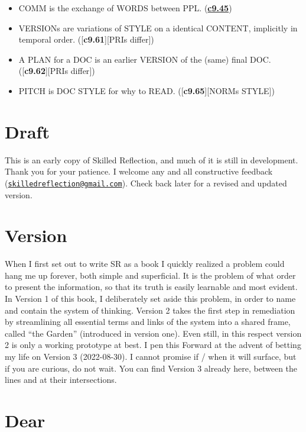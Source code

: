 \documentclass[
]{book}
\begin{document}
\begin{itemize}
\item
  COMM is the exchange of WORDS between PPL. (\hyperref[style]{\textbf{c9.45}})\\
\item
  VERSIONs are variations of STYLE on a identical CONTENT, implicitly in temporal order. ({[}\textbf{c9.61}{]}{[}PRIs differ{]})\\
\item
  A PLAN for a DOC is an earlier VERSION of the (same) final DOC. ({[}\textbf{c9.62}{]}{[}PRIs differ{]})\\
\item
  PITCH is DOC STYLE for why to READ. ({[}\textbf{c9.65}{]}{[}NORMs STYLE{]})
\end{itemize}

\section{Draft}\label{draft}

This is an early copy of Skilled Reflection, and much of it is still in development. Thank you for your patience. I welcome any and all constructive feedback (\href{mailto:skilledreflection@gmail.com}{\nolinkurl{skilledreflection@gmail.com}}). Check back later for a revised and updated version.

\section{Version}\label{version}

When I first set out to write SR as a book I quickly realized a problem could hang me up forever, both simple and superficial.
It is the problem of what order to present the information, so that its truth is easily learnable and most evident.
In Version 1 of this book, I deliberately set aside this problem, in order to name and contain the system of thinking.
Version 2 takes the first step in remediation by streamlining all essential terms and links of the system into a shared frame, called ``the Garden'' (introduced in version one). Even still, in this respect version 2 is only a working prototype at best.
I pen this Forward at the advent of betting my life on Version 3 (2022-08-30). I cannot promise if / when it will surface, but if you are curious, do not wait. You can find Version 3 already here, between the lines and at their intersections.

\section{Dear}\label{dear}
\end{document}

